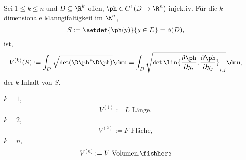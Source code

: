 \begin{defn}
\label{defn:4.19}
Sei $1\le k\le n$ und $D\subseteq \R^k$ offen, $\ph\in C^1(D\to \R^n)$
injektiv. Für die $k$-dimensionale Manngifaltigkeit im $\R^n$,
\begin{align*}
S := \setdef{\ph(y)}{y\in D} = \phi(D),
\end{align*}
ist,
\begin{align*}
V^{(k)}(S) := \int_D \sqrt{\det (\D\ph^*\D\ph)}\dmu
= \int_D \sqrt{\det \lin{\frac{\partial \ph}{\partial y_i},
\frac{\partial \ph}{\partial y_j}}_{i,j}}\dmu,
\end{align*}
der $k$-Inhalt von $S$.

\begin{bemn}[Spezialfälle]
$k=1$,
\begin{align*}
V^{(1)} := L \text{ Länge},
\end{align*}
$k=2$,
\begin{align*}
V^{(2)} := F \text{ Fläche},
\end{align*}
$k=n$,
\begin{align*}
V^{(n)} := V \text{ Volumen}.\fishhere
\end{align*}
\end{bemn}
\end{defn}

